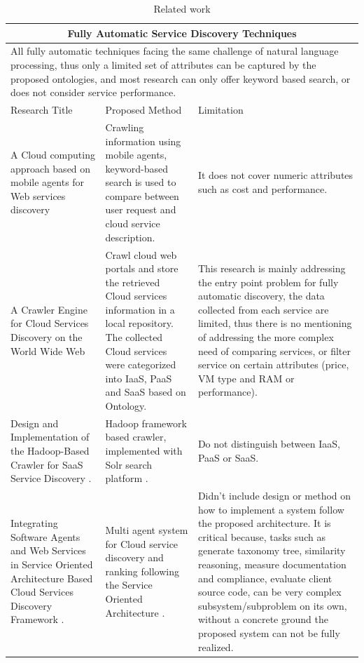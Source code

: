 \begin{longtable}{ p{30mm} | p{50mm} | p{50mm} } 
\caption{Related work \label{table:related_work}} \\
\hline
\multicolumn{3}{c}{ \cellcolor{yellow} Fully Automatic Service Discovery Techniques}\\
\hline
\multicolumn{3}{p{140mm}}{All fully automatic techniques facing the same challenge of natural language processing, thus only a limited set of attributes can be captured by the proposed ontologies, and most research can only offer keyword based search, or does not consider service performance.}\\
\hline
Research Title & Proposed Method & Limitation \\ 
\hline
    A Cloud computing approach based on mobile agents for Web services discovery
    \cite{MobileAgentsWebServicesDiscovery}&
    Crawling information using mobile agents, keyword-based search is used to compare between user request and cloud service description.& 
    It does not cover numeric attributes such as cost and performance.\\
\hline
	A Crawler Engine for Cloud Services Discovery on the World Wide Web \cite{CSCE} &
    Crawl cloud web portals and store the retrieved Cloud services information in a local repository. The collected Cloud services were categorized into IaaS, PaaS and SaaS based on Ontology.&
    This research is mainly addressing the entry point problem for fully automatic discovery, the data collected from each service are limited, thus there is no mentioning of addressing the more complex need of comparing services, or filter service on certain attributes (price, VM type and RAM or performance).\\
\hline
	Design and Implementation of the Hadoop-Based Crawler for SaaS Service Discovery \cite{Hadoop-BasedCrawlerForSaaSDiscovery}.&
    Hadoop framework \cite{Hadoop} based crawler, implemented with Solr search platform \citet{ApacheSolr}.&
    Do not distinguish between IaaS, PaaS or SaaS. \\
\hline
	Integrating Software Agents and Web Services in Service Oriented Architecture Based Cloud Services Discovery Framework \cite{AgentSOAServicesDiscovery}.&
	Multi agent system for Cloud service discovery and ranking following the Service Oriented Architecture \cite{SOA}. &
    Didn't include design or method on how to implement a system follow the proposed architecture. It is critical because, tasks such as generate taxonomy tree, similarity reasoning, measure documentation and compliance, evaluate client source code, can be very complex subsystem/subproblem on its own, without a concrete ground the proposed system can not be fully realized.\\

\end{longtable}
